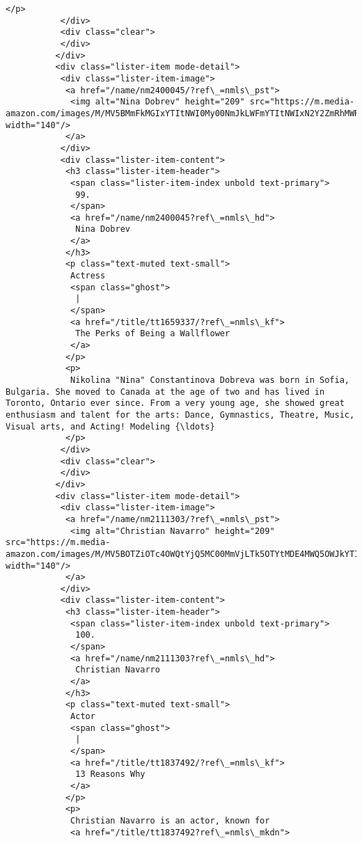 \documentclass[11pt]{article}
\begin{document}
\begin{Verbatim}[commandchars=\\\{\}]
            </p>
           </div>
           <div class="clear">
           </div>
          </div>
          <div class="lister-item mode-detail">
           <div class="lister-item-image">
            <a href="/name/nm2400045/?ref\_=nmls\_pst">
             <img alt="Nina Dobrev" height="209" src="https://m.media-amazon.com/images/M/MV5BMmFkMGIxYTItNWI0My00NmJkLWFmYTItNWIxN2Y2ZmRhMWRlXkEyXkFqcGdeQXVyMTM5NDMzMjY@.\_V1\_UX140\_CR0,0,140,209\_AL\_.jpg" width="140"/>
            </a>
           </div>
           <div class="lister-item-content">
            <h3 class="lister-item-header">
             <span class="lister-item-index unbold text-primary">
              99.
             </span>
             <a href="/name/nm2400045?ref\_=nmls\_hd">
              Nina Dobrev
             </a>
            </h3>
            <p class="text-muted text-small">
             Actress
             <span class="ghost">
              |
             </span>
             <a href="/title/tt1659337/?ref\_=nmls\_kf">
              The Perks of Being a Wallflower
             </a>
            </p>
            <p>
             Nikolina "Nina" Constantinova Dobreva was born in Sofia, Bulgaria. She moved to Canada at the age of two and has lived in Toronto, Ontario ever since. From a very young age, she showed great enthusiasm and talent for the arts: Dance, Gymnastics, Theatre, Music, Visual arts, and Acting! Modeling {\ldots}
            </p>
           </div>
           <div class="clear">
           </div>
          </div>
          <div class="lister-item mode-detail">
           <div class="lister-item-image">
            <a href="/name/nm2111303/?ref\_=nmls\_pst">
             <img alt="Christian Navarro" height="209" src="https://m.media-amazon.com/images/M/MV5BOTZiOTc4OWQtYjQ5MC00MmVjLTk5OTYtMDE4MWQ5OWJkYTI3XkEyXkFqcGdeQXVyNTI5NjIyMw@@.\_V1\_UX140\_CR0,0,140,209\_AL\_.jpg" width="140"/>
            </a>
           </div>
           <div class="lister-item-content">
            <h3 class="lister-item-header">
             <span class="lister-item-index unbold text-primary">
              100.
             </span>
             <a href="/name/nm2111303?ref\_=nmls\_hd">
              Christian Navarro
             </a>
            </h3>
            <p class="text-muted text-small">
             Actor
             <span class="ghost">
              |
             </span>
             <a href="/title/tt1837492/?ref\_=nmls\_kf">
              13 Reasons Why
             </a>
            </p>
            <p>
             Christian Navarro is an actor, known for
             <a href="/title/tt1837492?ref\_=nmls\_mkdn">

\end{Verbatim}
\end{document}
